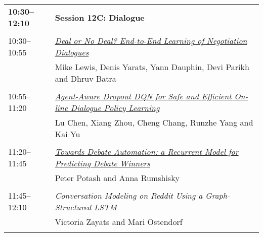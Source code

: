 \begin{tabular}{p{20mm}p{128mm}}
\\{\bf 10:30--12:10} & {\bf Session 12C: Dialogue } \\
\\
10:30--10:55 & \hyperlink{page.2426}{\em Deal or No Deal? End-to-End Learning of Negotiation Dialogues}\\
         & Mike Lewis, Denis Yarats, Yann Dauphin, Devi Parikh and Dhruv Batra \\
\\

10:55--11:20 & \hyperlink{page.2437}{\em Agent-Aware Dropout DQN for Safe and Efficient On-line Dialogue Policy Learning}\\
         & Lu Chen, Xiang Zhou, Cheng Chang, Runzhe Yang and Kai Yu \\
\\

11:20--11:45 & \hyperlink{page.2448}{\em Towards Debate Automation: a Recurrent Model for Predicting Debate Winners}\\
         & Peter Potash and Anna Rumshisky \\
\\

11:45--12:10 & {\em Conversation Modeling on Reddit Using a Graph-Structured LSTM}\\
         & Victoria Zayats and Mari Ostendorf \\
\\

\end{tabular}
\newpage

